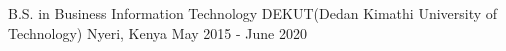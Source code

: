 
\begin{cventries}

  \cventry
    {B.S. in Business Information Technology} %
    {DEKUT(Dedan Kimathi University of Technology)} %
    {Nyeri, Kenya} %
    {May 2015 - June 2020} %
    {
    }

\end{cventries}
